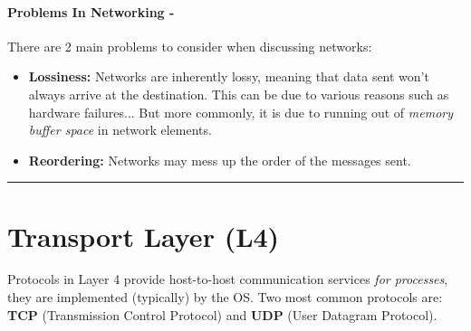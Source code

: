 \documentclass[openany,12pt]{book}
\begin{document}
\paragraph{Problems In Networking - } There are 2 main problems to consider when discussing networks:
\begin{itemize}
  \item \textbf{Lossiness:} Networks are inherently lossy, meaning that data sent won't always arrive at the destination. This can be due to various reasons such as hardware failures... But more commonly, it is due to running out of \textit{memory buffer space} in network elements.
  \item \textbf{Reordering:} Networks may mess up the order of the messages sent.
\end{itemize}





\noindent\rule{\linewidth}{0.5pt}


\section*{Transport Layer (L4)}

Protocols in Layer 4 provide host-to-host communication services \textit{for processes}, they are implemented (typically) by the OS. Two most common protocols are: \textbf{TCP} (Transmission Control Protocol) and \textbf{UDP} (User Datagram Protocol).
\end{document}
